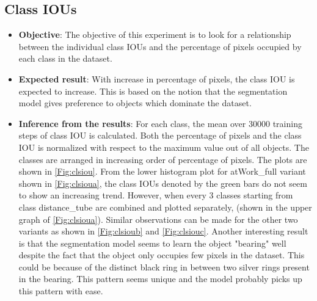 	\subsection{Class IOUs}	
		\begin{itemize}
			\item \textbf{Objective}: The objective of this experiment is to look for a relationship between the individual class IOUs and the percentage of pixels occupied by each class in the dataset. 
			\item \textbf{Expected result}: With increase in percentage of pixels, the class IOU is expected to increase. This is based on the notion that the segmentation model gives preference to objects which dominate the dataset. 
			\item \textbf{Inference from the results}: For each class, the mean over 30000 training steps of class IOU is calculated. Both the percentage of pixels and the class IOU is normalized with respect to the maximum value out of all objects. The classes are arranged in increasing order of percentage of pixels. The plots are shown in \ref{Fig:clsiou}. From the lower histogram plot for atWork\_full variant shown in \ref{Fig:clsioua}, the class IOUs denoted by the green bars do not seem to show an increasing trend. However, when every 3 classes starting from class distance\_tube are combined and plotted separately, (shown in the upper graph of \ref{Fig:clsioua}). Similar observations can be made for the other two variants as shown in \ref{Fig:clsioub} and \ref{Fig:clsiouc}. 
			Another interesting result is that the segmentation model seems to learn the object "bearing" well despite the fact that the object only occupies few pixels in the dataset. This could be because of the distinct black ring in between two silver rings present in the bearing. This pattern seems unique and the model probably picks up this pattern with ease.
		\end{itemize}
	
